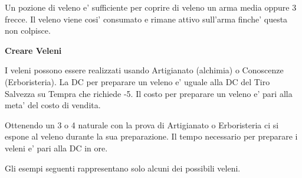 \documentclass[a4paper,11pt,twoside,openany]{book}
\begin{document}
Un pozione di veleno e' sufficiente per coprire di veleno un arma media oppure 3 frecce. Il veleno viene cosi' consumato e rimane attivo sull'arma finche' questa non colpisce.

\textbf{Creare Veleni}

I veleni possono essere realizzati usando Artigianato (alchimia) o Conoscenze (Erboristeria). La DC per preparare un veleno e' uguale alla DC del Tiro Salvezza su Tempra che richiede -5. Il costo per preparare un veleno e' pari alla meta' del costo di vendita.

Ottenendo un 3 o 4 naturale con la prova di Artigianato o Erboristeria ci si espone al veleno durante la sua preparazione. Il tempo necessario per preparare i veleni e' pari alla DC in ore. 

Gli esempi seguenti rappresentano solo alcuni dei possibili veleni.
\bigskip
\end{document}
